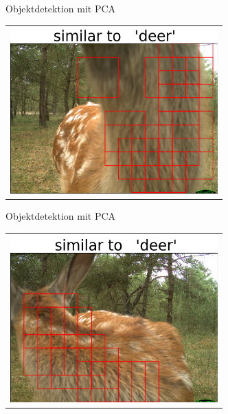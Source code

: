 \begin{frame}[t,fragile]{Objektdetektion mit  PCA}
  \vspace{0.01em}
  {
\begin{table}
\centering
        \begin{tabular}{c}
        \includegraphics[width=8cm]{images/Segmentierung/seg(8).png}\\
         \end{tabular}
\end{table}
 }

\end{frame}


\begin{frame}[t,fragile]{Objektdetektion mit  PCA}
  \vspace{0.01em}
  {
\begin{table}
\centering
        \begin{tabular}{c}
        \includegraphics[width=8cm]{images/Segmentierung/seg(9).png}
         \end{tabular}
\end{table}
 }

\end{frame}

